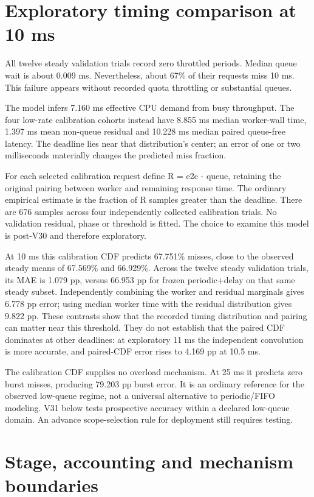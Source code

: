 \documentclass[11pt,a4paper]{article}
\begin{document}
\section{Exploratory timing comparison at 10 ms}

All twelve steady validation trials record zero throttled periods. Median queue
wait is about 0.009 ms. Nevertheless, about 67\% of their requests miss 10 ms.
This failure appears without recorded quota throttling or substantial queues.

The model infers 7.160 ms effective CPU demand from busy throughput. The four
low-rate calibration cohorts instead have 8.855 ms median worker-wall time,
1.397 ms mean non-queue residual and 10.228 ms median paired queue-free
latency. The deadline lies near that distribution's center; an error of one or
two milliseconds materially changes the predicted miss fraction.

For each selected calibration request define R = e2e - queue, retaining the
original pairing between worker and remaining response time. The ordinary
empirical estimate is the fraction of R samples greater than the deadline.
There are 676 samples across four independently collected calibration trials.
No validation residual, phase or threshold is fitted. The choice to examine
this model is post-V30 and therefore exploratory.

At 10 ms this calibration CDF predicts 67.751\% misses, close to the observed
steady means of 67.569\% and 66.929\%. Across the twelve steady validation trials,
its MAE is 1.079 pp, versus 66.953 pp for frozen periodic+delay on that same
steady subset. Independently combining the worker and residual marginals gives
6.778 pp error; using median worker time with the residual distribution gives
9.822 pp. These contrasts show that the recorded timing distribution and
pairing can matter near this threshold. They do not establish that the paired
CDF dominates at other deadlines: at exploratory 11 ms the independent
convolution is more accurate, and paired-CDF error rises to 4.169 pp at 10.5 ms.

The calibration CDF supplies no overload mechanism. At 25 ms it predicts zero
burst misses, producing 79.203 pp burst error. It is an ordinary reference for
the observed low-queue regime, not a universal alternative to periodic/FIFO
modeling. V31 below tests prospective accuracy within a declared low-queue
domain. An advance scope-selection rule for deployment still requires testing.

\section{Stage, accounting and mechanism boundaries}
\end{document}
